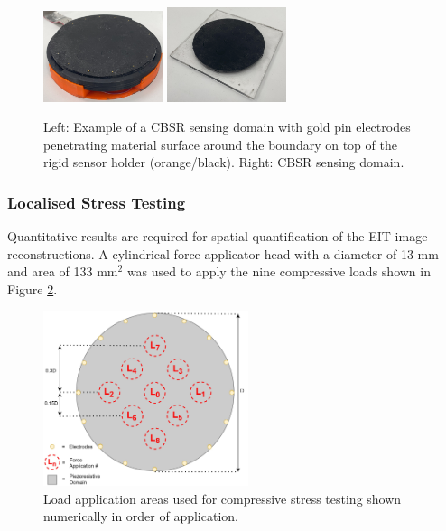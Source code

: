 \begin{figure}[H]
    \centering
    \includegraphics[width=3.5cm]{Figures/CBSR_DUT_w_electrodes_sample.jpg}
    \includegraphics[width=3.5cm]{Figures/CBSR_DUT_sample.jpg}
    \caption{Left: Example of a CBSR sensing domain with gold pin electrodes penetrating material surface around the boundary on top of the rigid sensor holder (orange/black). Right: CBSR sensing domain.}
    \label{fig:CBSR sample and holder}
\end{figure}

\subsubsection{Localised Stress Testing} \label{sec:Localised Stress Testing}
Quantitative results are required for spatial quantification of the EIT image reconstructions. A cylindrical force applicator head with a diameter of 13 mm and area of 133 mm$^2$ was used to apply the nine compressive loads shown in Figure \ref{fig:force_app_map}.
\begin{figure}[H]
    \centering
    \includegraphics[width=6cm]{Figures/EIT_force_app_points_v3.11.jpg}
    \caption{Load application areas used for compressive stress testing shown numerically in order of application.}
    \label{fig:force_app_map}
\end{figure}

